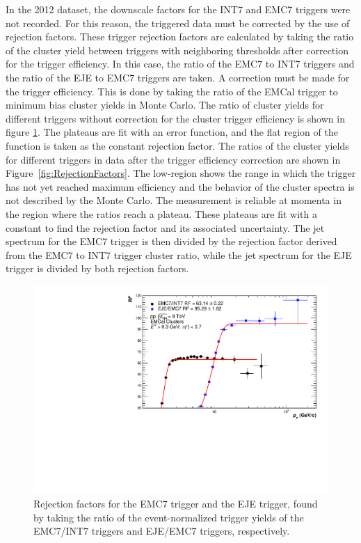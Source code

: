 In the 2012 dataset, the downscale factors for the INT7 and EMC7 triggers were not recorded. For this reason, the triggered data must be corrected by the use of rejection factors. These trigger rejection factors are calculated by taking the ratio of the cluster yield between triggers with neighboring thresholds after correction for the trigger efficiency. In this case, the ratio of the EMC7 to INT7 triggers and the ratio of the EJE to EMC7 triggers are taken. A correction must be made for the trigger efficiency. This is done by taking the ratio of the EMCal trigger to minimum bias cluster yields in Monte Carlo. The ratio of cluster yields for different triggers without correction for the cluster trigger efficiency is shown in figure \ref{fig:RejectionFactorsUnscaled}. The plateaus are fit with an error function, and the flat region of the function is taken as the constant rejection factor. The ratios of the cluster yields for different triggers in data after the trigger efficiency correction are shown in Figure~\ref{fig:RejectionFactors}. The low-\pT region shows the range in which the trigger has not yet reached maximum efficiency and the behavior of the cluster spectra is not described by the Monte Carlo. The measurement is reliable at momenta in the region where the ratios reach a plateau. These plateaus are fit with a constant to find the rejection factor and its associated uncertainty. The jet spectrum for the EMC7 trigger is then divided by the rejection factor derived from the EMC7 to INT7 trigger cluster ratio, while the jet spectrum for the EJE trigger is divided by both rejection factors.

\begin{figure}
    \centering
    \includegraphics[width=15cm]{figures/RejectionFactors/RF_R02_Unscaled_Default.pdf}
    \caption{Rejection factors for the EMC7 trigger and the EJE trigger, found by taking the ratio of the event-normalized trigger yields of the EMC7/INT7 triggers and EJE/EMC7 triggers, respectively.}
    \label{fig:RejectionFactorsUnscaled}
\end{figure}


